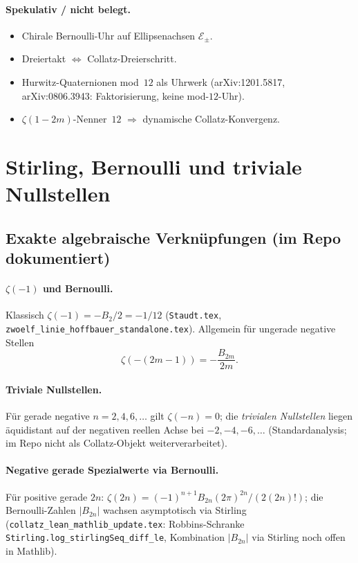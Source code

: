 \documentclass[11pt,a4paper]{article}
\theoremstyle{definition}
\theoremstyle{remark}
\begin{document}
\paragraph{Spekulativ / nicht belegt.}
\begin{itemize}[nosep]
  \item Chirale Bernoulli-Uhr auf Ellipsenachsen $\mathcal{E}_\pm$.
  \item Dreiertakt $\Leftrightarrow$ Collatz-Dreierschritt.
  \item Hurwitz-Quaternionen mod~$12$ als Uhrwerk
    (arXiv:1201.5817, arXiv:0806.3943: Faktorisierung, keine mod-$12$-Uhr).
  \item $\zeta(1-2m)$-Nenner~$12$ $\Rightarrow$ dynamische Collatz-Konvergenz.
\end{itemize}

\section{Stirling, Bernoulli und triviale Nullstellen}
\label{sec:stirling-bernoulli}

\subsection{Exakte algebraische Verknüpfungen (im Repo dokumentiert)}

\paragraph{$\zeta(-1)$ und Bernoulli.}
Klassisch $\zeta(-1)=-B_2/2=-1/12$
(\texttt{Staudt.tex}, \texttt{zwoelf\_linie\_hoffbauer\_standalone.tex}).
Allgemein für ungerade negative Stellen
\[
\zeta(-(2m-1))=-\frac{B_{2m}}{2m}.
\]

\paragraph{Triviale Nullstellen.}
Für gerade negative $n=2,4,6,\ldots$ gilt $\zeta(-n)=0$; die
\emph{trivialen Nullstellen} liegen äquidistant auf der negativen
reellen Achse bei $-2,-4,-6,\ldots$ (Standardanalysis; im Repo
nicht als Collatz-Objekt weiterverarbeitet).

\paragraph{Negative gerade Spezialwerte via Bernoulli.}
Für positive gerade $2n$:
$\zeta(2n)=(-1)^{n+1}B_{2n}(2\pi)^{2n}/(2(2n)!)$; die Bernoulli-Zahlen
$|B_{2n}|$ wachsen asymptotisch via Stirling
(\texttt{collatz\_lean\_mathlib\_update.tex}: Robbins-Schranke
\texttt{Stirling.log\_stirlingSeq\_diff\_le}, Kombination $|B_{2n}|$
via Stirling noch offen in Mathlib).
\end{document}
